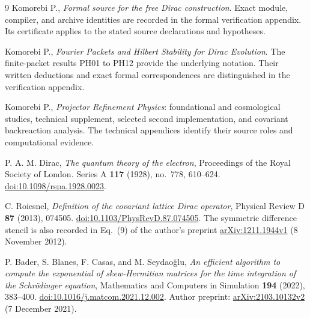 \clearpage{}
\renewcommand{\refname}{Sources and further reading}
\begin{thebibliography}{9}
 Komorebi P., \emph{Formal source for the free Dirac construction}. Exact module, compiler, and archive identities are recorded in the formal verification appendix. Its certificate applies to the stated source declarations and hypotheses.

 Komorebi P., \emph{Fourier Packets and Hilbert Stability for Dirac Evolution}. The finite-packet results PH01 to PH12 provide the underlying notation. Their written deductions and exact formal correspondences are distinguished in the verification appendix.

 Komorebi P., \emph{Projector Refinement Physics}: foundational and cosmological studies, technical supplement, selected second implementation, and covariant backreaction analysis. The technical appendices identify their source roles and computational evidence.



P. A. M. Dirac,
\emph{The quantum theory of the electron},
Proceedings of the Royal Society of London. Series A
\textbf{117} (1928), no.~778, 610--624.
\href{https://doi.org/10.1098/rspa.1928.0023}{doi:10.1098/rspa.1928.0023}.

C. Roiesnel,
\emph{Definition of the covariant lattice Dirac operator},
Physical Review D \textbf{87} (2013), 074505.
\href{https://doi.org/10.1103/PhysRevD.87.074505}{doi:10.1103/PhysRevD.87.074505}.
The symmetric difference stencil is also recorded in Eq.~(9) of the
author's preprint
\href{https://arxiv.org/abs/1211.1944v1}{arXiv:1211.1944v1}
(8 November 2012).

P. Bader, S. Blanes, F. Casas, and M. Seydao\u{g}lu,
\emph{An efficient algorithm to compute the exponential of skew-Hermitian
matrices for the time integration of the Schr\"odinger equation},
Mathematics and Computers in Simulation \textbf{194} (2022), 383--400.
\href{https://doi.org/10.1016/j.matcom.2021.12.002}{doi:10.1016/j.matcom.2021.12.002}.
Author preprint:
\href{https://arxiv.org/abs/2103.10132v2}{arXiv:2103.10132v2}
(7 December 2021).

\end{thebibliography}
